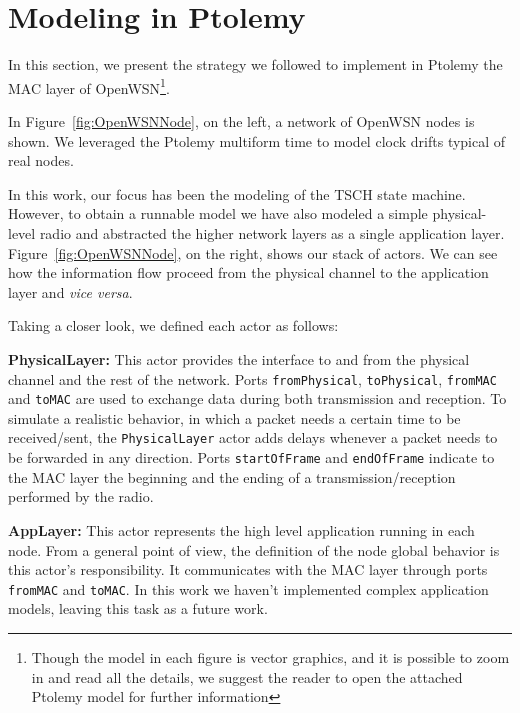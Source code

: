 
\section{Modeling in Ptolemy}
\label{sec:modeling-ptolemy}

In this section, we present the strategy we followed to implement in Ptolemy the MAC layer of OpenWSN\footnote{Though the model in each figure is vector graphics, and it is possible to zoom in and read all the details, we  suggest the reader to open the attached Ptolemy model for further information}.

In Figure~\ref{fig:OpenWSNNode}, on the left, a network of OpenWSN nodes is shown. We leveraged the Ptolemy multiform time to model clock drifts typical of real nodes. 

In this work, our focus has been the modeling of the TSCH state machine. However, to obtain a runnable model we have also modeled a simple physical-level radio and abstracted the higher network layers as a single application layer. Figure~\ref{fig:OpenWSNNode}, on the right, shows our stack of actors. We can see how the information flow proceed from the physical channel to the application layer and \emph{vice versa}. 

Taking a closer look, we defined each actor as follows:

{\bf PhysicalLayer:} This actor provides the interface to and from the physical channel and the rest of the network. Ports \texttt{fromPhysical}, \texttt{toPhysical}, \texttt{fromMAC} and \texttt{toMAC} are used to exchange data during both transmission and reception.
To simulate a realistic behavior, in which a packet needs a certain time to be received/sent, the \texttt{PhysicalLayer} actor adds delays whenever a packet needs to be forwarded in any direction. Ports \texttt{startOfFrame} and \texttt{endOfFrame} indicate to the MAC layer the beginning and the ending of a transmission/reception performed by the radio. 

{\bf AppLayer:} This actor represents the high level application running in each node. From a general point of view, the definition of the node global behavior is this actor's responsibility. It communicates with the MAC layer through ports \texttt{fromMAC} and \texttt{toMAC}. In this work we haven't implemented complex application models, leaving this task as a future work. 

